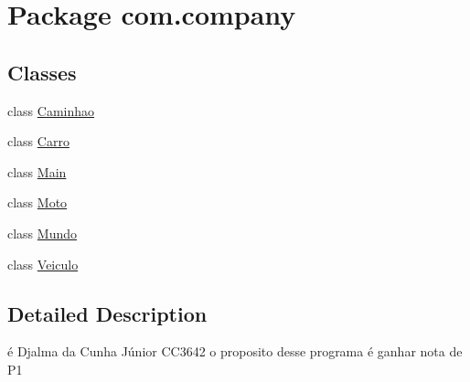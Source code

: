 \hypertarget{namespacecom_1_1company}{}\section{Package com.\+company}
\label{namespacecom_1_1company}
\subsection*{Classes}
\begin{DoxyCompactItemize}
\item 
class \mbox{\hyperlink{classcom_1_1company_1_1_caminhao}{Caminhao}}
\item 
class \mbox{\hyperlink{classcom_1_1company_1_1_carro}{Carro}}
\item 
class \mbox{\hyperlink{classcom_1_1company_1_1_main}{Main}}
\item 
class \mbox{\hyperlink{classcom_1_1company_1_1_moto}{Moto}}
\item 
class \mbox{\hyperlink{classcom_1_1company_1_1_mundo}{Mundo}}
\item 
class \mbox{\hyperlink{classcom_1_1company_1_1_veiculo}{Veiculo}}
\end{DoxyCompactItemize}


\subsection{Detailed Description}
é Djalma da Cunha Júnior C\+C3642 o proposito desse programa é ganhar nota de P1 